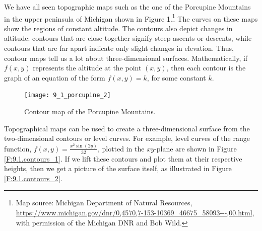 We have all seen topographic maps such as the one of the Porcupine
Mountains in the upper peninsula of Michigan shown in Figure
\ref{F:9.1.porcupine}.\footnote{Map source: Michigan Department of
  Natural Resources,
  \url{https://www.michigan.gov/dnr/0,4570,7-153-10369_46675_58093---,00.html},
  with permission of the Michigan DNR and Bob Wild.} The curves on
these maps show the regions of constant altitude. The contours also
depict changes in altitude: contours that are close together signify
steep ascents or descents, while contours that are far apart indicate
only slight changes in elevation.  Thus, contour maps tell us a lot
about three-dimensional surfaces. Mathematically, if $f(x,y)$
represents the altitude at the point $(x,y)$, then each contour is the
graph of an equation of the form $f(x,y) = k$, for some constant $k$.

\newpage
\begin{landscape}
\begin{figure}[h]
\begin{center}
\resizebox{!}{5.0in}
{\texttt{[image: 9\_1\_porcupine\_2]}}
% 
\caption{Contour map of the Porcupine Mountains.}
\label{F:9.1.porcupine}
\end{center}
\end{figure}
\end{landscape}
\newpage



\vspace*{5pt}
\nin {}
\vspace*{5pt}

Topographical maps can be used to create a three-dimensional surface
from the two-dimensional contours or level curves. For example, level
curves of the range function, $f(x,y) = \frac{x^2 \sin(2y)}{32}$,
plotted in the $xy$-plane are shown in Figure
\ref{F:9.1.contours_1}. If we lift these contours and plot them at
their respective heights, then we get a picture of the surface itself,
as illustrated in Figure \ref{F:9.1.contours_2}.

